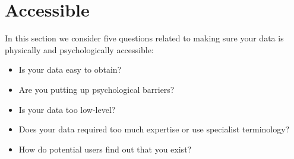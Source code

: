 \section{Accessible}

In this section we consider five questions related to making sure your data is physically and psychologically accessible:

\begin{itemize}
    \item Is your data easy to obtain?
    \item Are you putting up psychological barriers?
    \item Is your data too low-level?
    \item Does your data required too much expertise or use specialist terminology?
    \item How do potential users find out that you exist?
\end{itemize}





